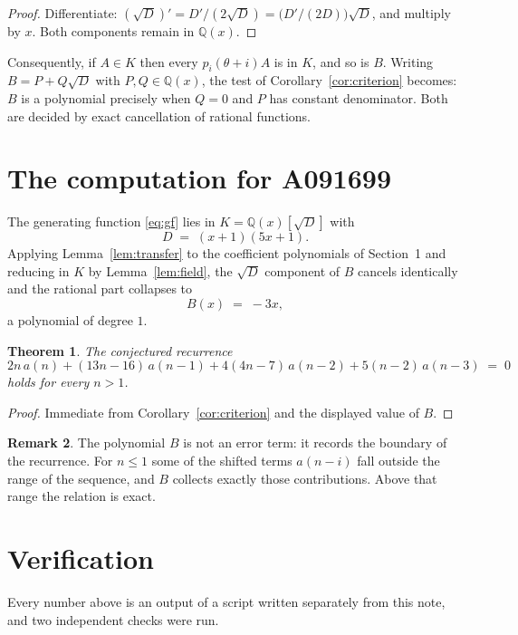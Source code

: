 \documentclass[11pt,a4paper]{article}
\theoremstyle{plain}
\newtheorem{theorem}{Theorem}
\theoremstyle{definition}
\newtheorem{remark}[theorem]{Remark}
\begin{document}
\begin{proof}
Differentiate: $(\sqrt{D})'=D'/(2\sqrt{D})=\bigl(D'/(2D)\bigr)\sqrt{D}$, and multiply by
$x$. Both components remain in $\mathbb{Q}(x)$.
\end{proof}

Consequently, if $A\in K$ then every $p_{i}(\theta+i)A$ is in $K$, and so is $B$. Writing
$B=P+Q\sqrt{D}$ with $P,Q\in\mathbb{Q}(x)$, the test of Corollary~\ref{cor:criterion}
becomes: $B$ is a polynomial precisely when $Q=0$ and $P$ has constant denominator. Both
are decided by exact cancellation of rational functions.

\section{The computation for A091699}

The generating function \eqref{eq:gf} lies in $K=\mathbb{Q}(x)[\sqrt{D}]$ with
\[
D \;=\; \left(x + 1\right) \left(5 x + 1\right) .
\]
Applying Lemma~\ref{lem:transfer} to the coefficient polynomials of Section~1 and reducing
in $K$ by Lemma~\ref{lem:field}, the $\sqrt{D}$ component of $B$ cancels identically and
the rational part collapses to
\[
B(x)\;=\;- 3 x ,
\]
a polynomial of degree $1$.

\begin{theorem}
The conjectured recurrence
\[
2 n\,a(n) + (13 n - 16)\,a(n-1) + 4 \left(4 n - 7\right)\,a(n-2) + 5 \left(n - 2\right)\,a(n-3) \;=\;0
\]
holds for every $n>1$.
\end{theorem}

\begin{proof}
Immediate from Corollary~\ref{cor:criterion} and the displayed value of $B$.
\end{proof}

\begin{remark}
The polynomial $B$ is not an error term: it records the boundary of the recurrence. For
$n\le1$ some of the shifted terms $a(n-i)$ fall outside the range of the sequence,
and $B$ collects exactly those contributions. Above that range the relation is exact.
\end{remark}

\section{Verification}

Every number above is an output of a script written separately from this note, and two
independent checks were run.
\end{document}
